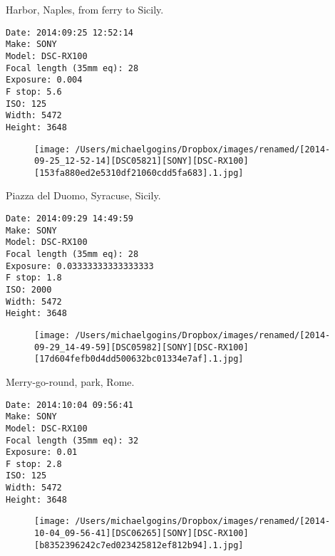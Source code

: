 \documentclass[11pt,letter,DIV=14,paper=landscape]{scrbook}
\begin{document}
\clearpage
\noindent Harbor, Naples, from ferry to Sicily.
\noindent
\begin{lstlisting}
Date: 2014:09:25 12:52:14
Make: SONY
Model: DSC-RX100
Focal length (35mm eq): 28
Exposure: 0.004
F stop: 5.6
ISO: 125
Width: 5472
Height: 3648
\end{lstlisting}
\clearpage

\begin{figure}
\texttt{[image: /Users/michaelgogins/Dropbox/images/renamed/[2014-09-25\_12-52-14][DSC05821][SONY][DSC-RX100][153fa880ed2e5310df21060cdd5fa683].1.jpg]}
\end{figure}
    
\clearpage
\noindent Piazza del Duomo, Syracuse, Sicily.
\noindent
\begin{lstlisting}
Date: 2014:09:29 14:49:59
Make: SONY
Model: DSC-RX100
Focal length (35mm eq): 28
Exposure: 0.03333333333333333
F stop: 1.8
ISO: 2000
Width: 5472
Height: 3648
\end{lstlisting}
\clearpage

\begin{figure}
\texttt{[image: /Users/michaelgogins/Dropbox/images/renamed/[2014-09-29\_14-49-59][DSC05982][SONY][DSC-RX100][17d604fefb0d4dd500632bc01334e7af].1.jpg]}
\end{figure}
    
\clearpage
\noindent Merry-go-round, park, Rome.
\noindent
\begin{lstlisting}
Date: 2014:10:04 09:56:41
Make: SONY
Model: DSC-RX100
Focal length (35mm eq): 32
Exposure: 0.01
F stop: 2.8
ISO: 125
Width: 5472
Height: 3648
\end{lstlisting}
\clearpage

\begin{figure}
\texttt{[image: /Users/michaelgogins/Dropbox/images/renamed/[2014-10-04\_09-56-41][DSC06265][SONY][DSC-RX100][b8352396242c7ed023425812ef812b94].1.jpg]}
\end{figure}
    
\end{document}
